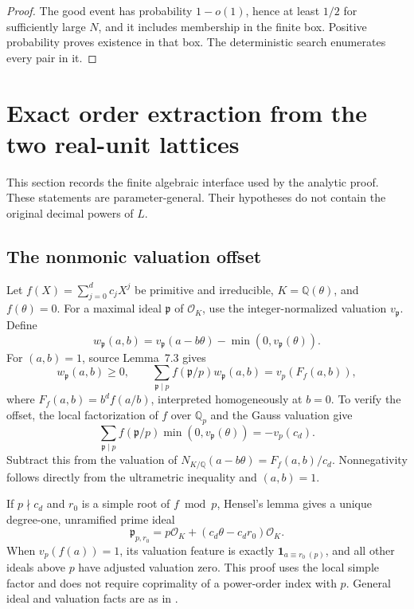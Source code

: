 \begin{proof}
The good event has probability \(1-o(1)\), hence at least \(1/2\)
for sufficiently large \(N\), and it includes membership in the
finite box.  Positive probability proves existence in that box.
The deterministic search enumerates every pair in it.
\end{proof}

\section{Exact order extraction from the two real-unit lattices}
\label{sec:extraction}

This section records the finite algebraic interface used by the analytic
proof.  These statements are parameter-general.  Their hypotheses do
not contain the original decimal powers of \(L\).

\subsection{The nonmonic valuation offset}

Let \(f(X)=\sum_{j=0}^dc_jX^j\) be primitive and irreducible,
\(K=\mathbb Q(\theta)\), and \(f(\theta)=0\).  For a maximal ideal
\(\mathfrak p\) of \(\mathcal O_K\), use the integer-normalized
valuation \(v_{\mathfrak p}\).  Define
\[
 w_{\mathfrak p}(a,b)=v_{\mathfrak p}(a-b\theta)
                       -\min(0,v_{\mathfrak p}(\theta)).
\]
For \((a,b)=1\), source Lemma~7.3 gives
\begin{equation}\label{eq:valuation-sum}
 w_{\mathfrak p}(a,b)\ge0,\qquad
 \sum_{\mathfrak p\mid p}f(\mathfrak p/p)
                 w_{\mathfrak p}(a,b)=v_p(F_f(a,b)),
\end{equation}
where \(F_f(a,b)=b^df(a/b)\), interpreted homogeneously at \(b=0\).
To verify the offset, the local factorization of \(f\) over
\(\mathbb Q_p\) and the Gauss valuation give
\[
 \sum_{\mathfrak p\mid p}f(\mathfrak p/p)
                 \min(0,v_{\mathfrak p}(\theta))=-v_p(c_d).
\]
Subtract this from the valuation of
\(N_{K/\mathbb Q}(a-b\theta)=F_f(a,b)/c_d\).
Nonnegativity follows directly from the ultrametric inequality and
\((a,b)=1\).

If \(p\nmid c_d\) and \(r_0\) is a simple root of \(f\bmod p\),
Hensel's lemma gives a unique degree-one, unramified prime ideal
\[
 \mathfrak p_{p,r_0}=p\mathcal O_K+
                    (c_d\theta-c_dr_0)\mathcal O_K.
\]
When \(v_p(f(a))=1\), its valuation feature is exactly
\(\mathbf1_{a\equiv r_0\ (p)}\), and all other ideals above
\(p\) have adjusted valuation zero.  This proof uses the local
simple factor and does not require coprimality of a power-order index
with \(p\).  General ideal and valuation facts are as in
\cite{Neukirch1999}.

